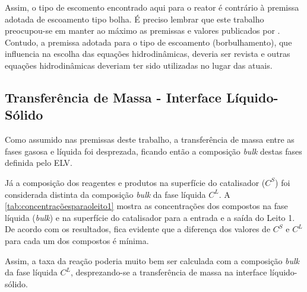 Assim, o tipo de escomento encontrado aqui para o reator é contrário à premissa
adotada de escoamento tipo bolha. É preciso lembrar que este trabalho
preocupou-se em manter ao máximo as premissas e valores publicados por
. Contudo, a premissa adotada para o tipo de escoamento
(borbulhamento), que influencia na escolha das equações hidrodinâmicas, deveria
ser revista e outras equações hidrodinâmicas deveriam ter sido utilizadas no
lugar das atuais.

\subsection{Transferência de Massa - Interface Líquido-Sólido}
\label{transferênciademassainterfaceliquidosolido}

Como assumido nas premissas deste trabalho, a transferência de massa entre as
fases gasosa e líquida foi desprezada, ficando então a composição \emph{bulk}
destas fases definida pelo ELV.

Já a composição dos reagentes e produtos na superfície do catalisador ($C^S$)
foi considerada distinta da composição \emph{bulk} da fase líquida $C^L$. A
\autoref{tab:concentraçõesparaoleito1} mostra as concentrações dos compostos na
fase líquida (\emph{bulk}) e na superfície do catalisador para a entrada e a
saída do Leito 1. De acordo com os resultados, fica evidente que a diferença dos
valores de $C^S$ e $C^L$ para cada um dos compostos é mínima.

Assim, a taxa da reação poderia muito bem ser calculada com a composição
\emph{bulk} da fase líquida $C^L$, desprezando-se a transferência de massa na
interface líquido-sólido.

